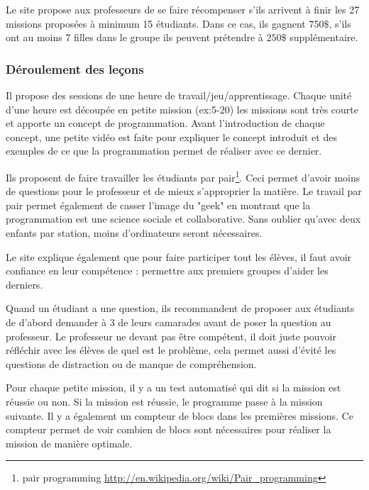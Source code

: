 Le site propose aux professeurs de se faire récompenser s'ils arrivent à finir les 27 missions proposées à minimum 15 étudiants. Dans ce cas, ils gagnent $750\$$, s'ils ont au moins 7 filles dans le groupe ils peuvent prétendre à $250\$$ supplémentaire.

\subsubsection{Déroulement des leçons}
Il propose des sessions de une heure de travail/jeu/apprentissage. Chaque unité d'une heure est découpée en petite mission (ex:5-20) les missions sont très courte et apporte un concept de programmation. Avant l'introduction de chaque concept, une petite vidéo est faite pour expliquer le concept introduit et des exemples de ce que la programmation permet de réaliser avec ce dernier.

Ils proposent de faire travailler les étudiants par pair\footnote{pair programming \url{http://en.wikipedia.org/wiki/Pair\_programming}}. Ceci permet d'avoir moins de questions pour le professeur et de mieux s'approprier la matière. Le travail par pair permet également de casser l'image du "geek" en montrant que la programmation est une science sociale et collaborative. Sans oublier qu'avec deux enfants par station, moins d'ordinateurs seront nécessaires.

Le site explique également que pour faire participer tout les élèves, il faut avoir confiance en leur compétence : permettre aux premiers groupes d'aider les derniers.

Quand un étudiant a une question, ils recommandent de proposer aux étudiants de d'abord demander à 3 de leurs camarades avant de poser la question au professeur. Le professeur ne devant pas être compétent, il doit juste pouvoir réfléchir avec les élèves de quel est le problème, cela permet aussi d'évité les questions de distraction ou de manque de compréhension.

Pour chaque petite mission, il y a un test automatisé qui dit si la mission est réussie ou non. Si la mission est réussie, le programme passe à la mission suivante. Il y a également un compteur de blocs dans les premières missions. Ce compteur permet de voir combien de blocs sont nécessaires pour réaliser la mission de manière optimale.

